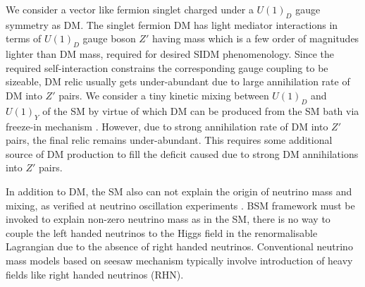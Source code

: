 \documentclass[prd,nofootinbib,preprint,superscriptaddress]{revtex4}
\begin{document}
	
	We consider a vector like fermion singlet charged under a $U(1)_D$ gauge symmetry as DM. The singlet fermion DM has light mediator interactions in terms of $U(1)_D$ gauge boson $Z'$ having mass which is a few order of magnitudes lighter than DM mass, required for desired SIDM phenomenology. Since the required self-interaction constrains the corresponding gauge coupling to be sizeable, DM relic usually gets under-abundant due to large annihilation rate of DM into $Z'$ pairs. We consider a tiny kinetic mixing between $U(1)_D$ and $U(1)_Y$ of the SM by virtue of which DM can be produced from the SM bath via freeze-in mechanism \cite{Hall:2009bx, Bernal:2017kxu}. However, due to strong annihilation rate of DM into $Z'$ pairs, the final relic remains under-abundant. This requires some additional source of DM production to fill the deficit caused due to strong DM annihilations into $Z'$ pairs. 
	
	
	In addition to DM, the SM also can not explain the origin of neutrino mass and mixing, as verified at neutrino oscillation experiments \cite{Zyla:2020zbs, Mohapatra:2005wg}. BSM framework must be invoked to explain non-zero neutrino mass as in the SM, there is no way to couple the left handed neutrinos to the Higgs field in the renormalisable Lagrangian due to the absence of right handed neutrinos. Conventional neutrino mass models based on seesaw mechanism \cite{Minkowski:1977sc, GellMann:1980vs, Mohapatra:1979ia, Schechter:1980gr, Mohapatra:1980yp, Lazarides:1980nt, Wetterich:1981bx, Schechter:1981cv, Foot:1988aq} typically involve introduction of heavy fields like right handed neutrinos (RHN).
	
\end{document}
